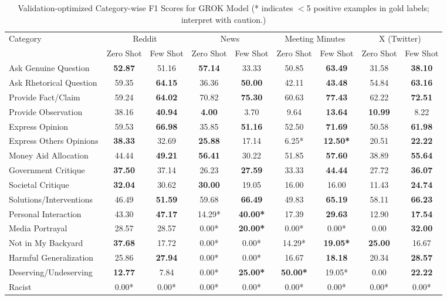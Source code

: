 \begin{table}[htbp]
\centering
\begin{tabular}{l *{8}{c}}
\toprule
Category & \multicolumn{2}{c}{Reddit} & \multicolumn{2}{c}{News} & \multicolumn{2}{c}{Meeting Minutes} & \multicolumn{2}{c}{X (Twitter)} \\
& Zero Shot & Few Shot & Zero Shot & Few Shot & Zero Shot & Few Shot & Zero Shot & Few Shot \\
\midrule
Ask Genuine Question & \textbf{52.87} & 51.16 & \textbf{57.14} & 33.33 & 50.85 & \textbf{63.49} & 31.58 & \textbf{38.10} \\
Ask Rhetorical Question & 59.35 & \textbf{64.15} & 36.36 & \textbf{50.00} & 42.11 & \textbf{43.48} & 54.84 & \textbf{63.16} \\
Provide Fact/Claim & 59.24 & \textbf{64.02} & 70.82 & \textbf{75.30} & 60.63 & \textbf{77.43} & 62.22 & \textbf{72.51} \\
Provide Observation & 38.16 & \textbf{40.94} & \textbf{4.00} & 3.70 & 9.64 & \textbf{13.64} & \textbf{10.99} & 8.22 \\
Express Opinion & 59.53 & \textbf{66.98} & 35.85 & \textbf{51.16} & 52.50 & \textbf{71.69} & 50.58 & \textbf{61.98} \\
Express Others Opinions & \textbf{38.33} & 32.69 & \textbf{25.88} & 17.14 & 6.25* & \textbf{12.50*} & 20.51 & \textbf{22.22} \\
Money Aid Allocation & 44.44 & \textbf{49.21} & \textbf{56.41} & 30.22 & 51.85 & \textbf{57.60} & 38.89 & \textbf{55.64} \\
Government Critique & \textbf{37.50} & 37.14 & 26.23 & \textbf{27.59} & 33.33 & \textbf{44.44} & 27.72 & \textbf{36.07} \\
Societal Critique & \textbf{32.04} & 30.62 & \textbf{30.00} & 19.05 & 16.00 & 16.00 & 11.43 & \textbf{24.74} \\
Solutions/Interventions & 46.49 & \textbf{51.59} & 59.68 & \textbf{66.49} & 49.83 & \textbf{65.19} & 58.11 & \textbf{66.23} \\
Personal Interaction & 43.30 & \textbf{47.17} & 14.29* & \textbf{40.00*} & 17.39 & \textbf{29.63} & 12.90 & \textbf{17.54} \\
Media Portrayal & 28.57 & 28.57 & 0.00* & \textbf{20.00*} & 0.00* & 0.00* & 0.00 & \textbf{32.00} \\
Not in My Backyard & \textbf{37.68} & 17.72 & 0.00* & 0.00* & 14.29* & \textbf{19.05*} & \textbf{25.00} & 16.67 \\
Harmful Generalization & 25.86 & \textbf{27.94} & 0.00* & 0.00* & 16.67 & \textbf{18.18} & 20.34 & \textbf{28.57} \\
Deserving/Undeserving & \textbf{12.77} & 7.84 & 0.00* & \textbf{25.00*} & \textbf{50.00*} & 19.05* & 0.00 & \textbf{22.22} \\
Racist & 0.00* & 0.00* & 0.00* & 0.00* & 0.00* & 0.00* & 0.00* & 0.00* \\
\bottomrule
\end{tabular}
\centering\caption{Validation-optimized Category-wise F1 Scores for GROK Model (* indicates $<$5 positive examples in gold labels; interpret with caution.)}
\label{tab:grok_category_breakdown}
\end{table}